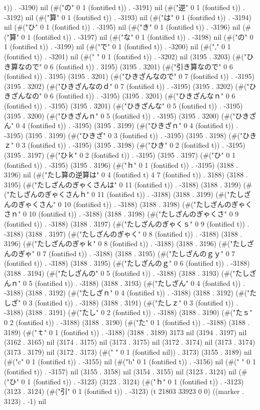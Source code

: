 t)) . -3190) nil (#("の" 0 1 (fontified t)) . -3191) nil (#("逆" 0 1 (fontified t)) . -3192) nil (#("算" 0 1 (fontified t)) . -3193) nil (#("は" 0 1 (fontified t)) . -3194) nil (#("ひ" 0 1 (fontified t)) . -3195) nil (#("き" 0 1 (fontified t)) . -3196) nil (#("算" 0 1 (fontified t)) . -3197) nil (#("な" 0 1 (fontified t)) . -3198) nil (#("の" 0 1 (fontified t)) . -3199) nil (#("で" 0 1 (fontified t)) . -3200) nil (#("," 0 1 (fontified t)) . -3201) nil (#(" " 0 1 (fontified t)) . -3202) nil (3195 . 3203) (#("ひき算なので" 0 6 (fontified t)) . 3195) (3195 . 3201) (#("引き算なので" 0 6 (fontified t)) . 3195) (3195 . 3201) (#("ひきざんなので" 0 7 (fontified t)) . -3195) (3195 . 3202) (#("ひきざんなのｄ" 0 7 (fontified t)) . -3195) (3195 . 3202) (#("ひきざんなの" 0 6 (fontified t)) . -3195) (3195 . 3201) (#("ひきざんなｎ" 0 6 (fontified t)) . -3195) (3195 . 3201) (#("ひきざんな" 0 5 (fontified t)) . -3195) (3195 . 3200) (#("ひきざんｎ" 0 5 (fontified t)) . -3195) (3195 . 3200) (#("ひきざん" 0 4 (fontified t)) . -3195) (3195 . 3199) (#("ひきざｎ" 0 4 (fontified t)) . -3195) (3195 . 3199) (#("ひきざ" 0 3 (fontified t)) . -3195) (3195 . 3198) (#("ひきｚ" 0 3 (fontified t)) . -3195) (3195 . 3198) (#("ひき" 0 2 (fontified t)) . -3195) (3195 . 3197) (#("ひｋ" 0 2 (fontified t)) . -3195) (3195 . 3197) (#("ひ" 0 1 (fontified t)) . -3195) (3195 . 3196) (#("ｈ" 0 1 (fontified t)) . -3195) (3188 . 3196) nil (#("たし算の逆算は" 0 4 (fontified t) 4 7 (fontified t)) . 3188) (3188 . 3195) (#("たしざんのぎゃくさんは" 0 11 (fontified t)) . -3188) (3188 . 3199) (#("たしざんのぎゃくさんｈ" 0 11 (fontified t)) . -3188) (3188 . 3199) (#("たしざんのぎゃくさん" 0 10 (fontified t)) . -3188) (3188 . 3198) (#("たしざんのぎゃくさｎ" 0 10 (fontified t)) . -3188) (3188 . 3198) (#("たしざんのぎゃくさ" 0 9 (fontified t)) . -3188) (3188 . 3197) (#("たしざんのぎゃくｓ" 0 9 (fontified t)) . -3188) (3188 . 3197) (#("たしざんのぎゃく" 0 8 (fontified t)) . -3188) (3188 . 3196) (#("たしざんのぎゃｋ" 0 8 (fontified t)) . -3188) (3188 . 3196) (#("たしざんのぎゃ" 0 7 (fontified t)) . -3188) (3188 . 3195) (#("たしざんのｇｙ" 0 7 (fontified t)) . -3188) (3188 . 3195) (#("たしざんのｇ" 0 6 (fontified t)) . -3188) (3188 . 3194) (#("たしざんの" 0 5 (fontified t)) . -3188) (3188 . 3193) (#("たしざんｎ" 0 5 (fontified t)) . -3188) (3188 . 3193) (#("たしざん" 0 4 (fontified t)) . -3188) (3188 . 3192) (#("たしざｎ" 0 4 (fontified t)) . -3188) (3188 . 3192) (#("たしざ" 0 3 (fontified t)) . -3188) (3188 . 3191) (#("たしｚ" 0 3 (fontified t)) . -3188) (3188 . 3191) (#("たし" 0 2 (fontified t)) . -3188) (3188 . 3190) (#("たｓ" 0 2 (fontified t)) . -3188) (3188 . 3190) (#("た" 0 1 (fontified t)) . -3188) (3188 . 3189) (#("ｔ" 0 1 (fontified t)) . -3188) (3188 . 3189) 3173 nil (3194 . 3197) nil (3162 . 3165) nil (3174 . 3175) nil (3173 . 3175) nil (3172 . 3174) nil (3173 . 3174) (3173 . 3179) nil (3172 . 3173) (#(" " 0 1 (fontified nil)) . 3173) (3155 . 3189) nil (#("c" 0 1 (fontified t)) . -3155) nil (#("b" 0 1 (fontified t)) . -3156) nil (#(" " 0 1 (fontified t)) . -3157) nil (3155 . 3158) nil (3154 . 3155) nil (3123 . 3124) nil (#("ひ" 0 1 (fontified t)) . -3123) (3123 . 3124) (#("ｈ" 0 1 (fontified t)) . -3123) (3123 . 3124) (#("引" 0 1 (fontified t)) . -3123) (t 21803 33923 0 0) ((marker . 3123) . -1) nil 